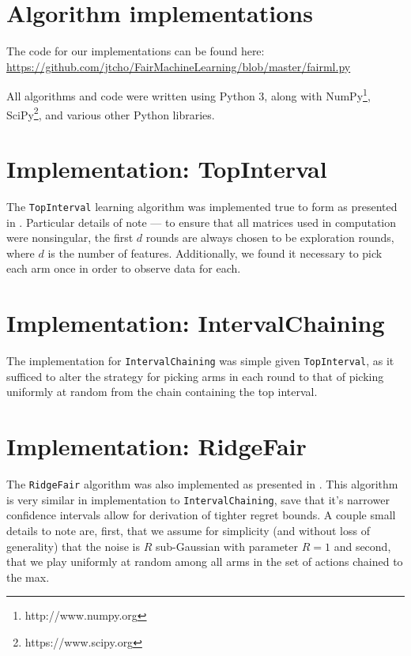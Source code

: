 \documentclass[11pt]{article}
\begin{document}
\section{Algorithm implementations}

The code for our implementations can be found here: \url{https://github.com/jtcho/FairMachineLearning/blob/master/fairml.py}

All algorithms and code were written using Python 3, along with NumPy\footnote{http://www.numpy.org}, SciPy\footnote{https://www.scipy.org}, and various other Python libraries.

\section{Implementation: TopInterval}

The \texttt{TopInterval} learning algorithm was implemented true to form as presented in \cite{DBLP:journals/corr/JosephKMNR16}. Particular details of note --- to ensure that all matrices used in computation were nonsingular, the first $d$ rounds are always chosen to be exploration rounds, where $d$ is the number of features. Additionally, we found it necessary to pick each arm once in order to observe data for each.

\section{Implementation: IntervalChaining}

The implementation for \texttt{IntervalChaining} was simple given \texttt{TopInterval}, as it sufficed to alter the strategy for picking arms in each round to that of picking uniformly at random from the chain containing the top interval.

\section{Implementation: RidgeFair}

The \texttt{RidgeFair} algorithm was also implemented as presented in . This algorithm is very similar in implementation to \texttt{IntervalChaining}, save that it’s narrower confidence intervals allow for derivation of tighter regret bounds. A couple small details to note are, first, that we assume for simplicity (and without loss of generality) that the noise is $R$ sub-Gaussian with parameter $R = 1$ and second, that we play uniformly at random among all arms in the set of actions chained to the max.
\end{document}
